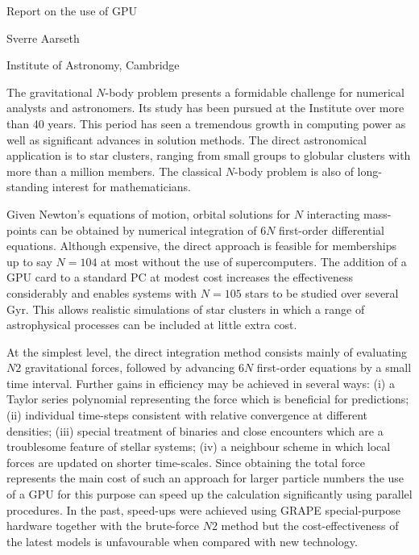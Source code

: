 \documentclass[12pt]{article}
\begin{document}
{\large
{\centerline{Report on the use of GPU}}

\medskip
\centerline{Sverre Aarseth}
\centerline{Institute of Astronomy, Cambridge}}

\bigskip
The gravitational $N$-body problem presents a formidable challenge for
numerical analysts and astronomers.
Its study has been pursued at the Institute over more than 40 years.
This period has seen a tremendous growth in computing power as well as
significant advances in solution methods.
The direct astronomical application is to star clusters, ranging from
small groups to globular clusters with more than a million members.
The classical $N$-body problem is also of long-standing interest for
mathematicians.

Given Newton's equations of motion, orbital solutions for $N$ interacting
mass-points can be obtained by numerical integration of $6N$ first-order
differential equations.
Although expensive, the direct approach is feasible for memberships up to
say $N=104$ at most without the use of supercomputers.
The addition of a GPU card to a standard PC at modest cost increases the
effectiveness considerably and enables systems with $N=105$ stars to be
studied over several Gyr.
This allows realistic simulations of star clusters in which a range of
astrophysical processes can be included at little extra cost.

At the simplest level, the direct integration method consists mainly of
evaluating $N2$ gravitational forces, followed by advancing $6N$ first-order
equations by a small time interval.
Further gains in efficiency may be achieved in several ways:
(i) a Taylor series polynomial representing the force which is beneficial
for predictions; (ii) individual time-steps consistent with relative
convergence at different densities; (iii) special treatment of binaries
and close encounters which are a troublesome feature of stellar systems;
(iv) a neighbour scheme in which local forces are updated on shorter
time-scales.
Since obtaining the total force represents the main cost of such an
approach for larger particle numbers the use of a GPU for this purpose can
speed up the calculation significantly using parallel procedures.
In the past, speed-ups were achieved using GRAPE special-purpose hardware
together with the brute-force $N2$ method but the cost-effectiveness of the
latest models is unfavourable when compared with new technology.
\end{document}
